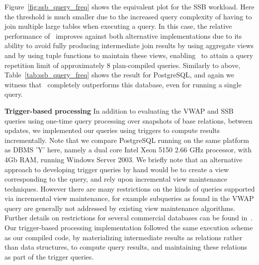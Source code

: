 Figure~\ref{fig:ssb_query_freq} shows the equivalent plot for the SSB workload.
Here the threshold is much smaller due to the increased query complexity of
having to join multiple large tables when executing a query. In this case, the
relative performance of \compiler\ improves against both alternative
implementations due to its ability to avoid fully producing intermediate join
results by using aggregate views and by using tuple functions to maintain these
views, enabling \compiler\ to attain a query repetition limit of approximately 8
plan-compiled queries. Similarly to above, Table~\ref{tab:ssb_query_freq} shows
the result for PostgreSQL, and again we witness that \compiler\ completely
outperforms this database, even for running a single query. 

\textbf{Trigger-based processing}
In addition to evaluating the VWAP and SSB queries using one-time query
processing over snapshots of base relations, between updates, we implemented our
queries using triggers to compute results incrementally. Note that we compare
PostgreSQL running on the same platform as DBMS 'Y' here, namely a dual core
Intel Xeon 5150 2.66 GHz processor, with 4Gb RAM, running Windows Server 2003. We
briefly note that an alternative approach to developing trigger queries by hand
would be to create a view corresponding to the query, and rely upon incremental
view maintenance techniques. However there are many restrictions on the kinds of
queries supported via incremental view maintenance, for example subqueries as
found in the VWAP query are generally not addressed by existing view maintenance
algorithms. Further details on restrictions for several commercial databases can
be found in~\cite{mssql-viewrestrict,db2-viewrestrict,oracle-viewrestrict}. Our
trigger-based processing implementation followed the same execution scheme as our
compiled code, by materializing intermediate results as relations rather than
data structures, to compute query results, and maintaining these relations as
part of the trigger queries.

